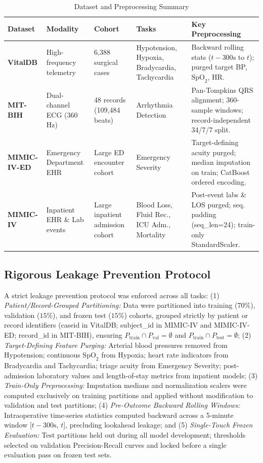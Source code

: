 \documentclass[conference]{IEEEtran}
\begin{document}
\begin{table}[t]
\centering
\caption{Dataset and Preprocessing Summary}
\label{tab:datasets}
\begin{tabularx}{\textwidth}{l l l l X}
\toprule
\textbf{Dataset} & \textbf{Modality} & \textbf{Cohort} & \textbf{Tasks} & \textbf{Key Preprocessing} \\
\midrule
\textbf{VitalDB} \cite{ref1} & High-frequency telemetry & 6,388 surgical cases & Hypotension, Hypoxia, Bradycardia, Tachycardia & Backward rolling stats ($t-300\text{s}$ to $t$); purged target BP, $\text{SpO}_2$, HR. \\
\textbf{MIT-BIH} & Dual-channel ECG (360 Hz) & 48 records (109,484 beats) & Arrhythmia Detection & Pan-Tompkins QRS alignment; 360-sample windows; record-independent 34/7/7 split. \\
\textbf{MIMIC-IV-ED} & Emergency Department EHR & Large ED encounter cohort & Emergency Severity & Target-defining acuity purged; median imputation on train; CatBoost ordered encoding. \\
\textbf{MIMIC-IV} & Inpatient EHR \& Lab events & Large inpatient admission cohort & Blood Loss, Fluid Rec., ICU Adm., Mortality & Post-event labs \& LOS purged; seq. padding (seq\_len=24); train-only StandardScaler. \\
\bottomrule
\end{tabularx}
\end{table}

\subsection{Rigorous Leakage Prevention Protocol}
A strict leakage prevention protocol was enforced across all tasks: (1) \textit{Patient/Record-Grouped Partitioning:} Data were partitioned into training ($70\%$), validation ($15\%$), and frozen test ($15\%$) cohorts, grouped strictly by patient or record identifiers (caseid in VitalDB; subject\_id in MIMIC-IV and MIMIC-IV-ED; record\_id in MIT-BIH), ensuring $P_{\text{train}} \cap P_{\text{val}} = \emptyset$ and $P_{\text{train}} \cap P_{\text{test}} = \emptyset$; (2) \textit{Target-Defining Feature Purging:} Arterial blood pressures removed from Hypotension; continuous $\text{SpO}_2$ from Hypoxia; heart rate indicators from Bradycardia and Tachycardia; triage acuity from Emergency Severity; post-admission laboratory values and length-of-stay metrics from inpatient models; (3) \textit{Train-Only Preprocessing:} Imputation medians and normalization scalers were computed exclusively on training partitions and applied without modification to validation and test partitions; (4) \textit{Pre-Outcome Backward Rolling Windows:} Intraoperative time-series statistics computed backward across a 5-minute window [$t - 300\text{s}$, $t$], precluding lookahead leakage; and (5) \textit{Single-Touch Frozen Evaluation:} Test partitions held out during all model development; thresholds selected on validation Precision-Recall curves and locked before a single evaluation pass on frozen test sets.
\end{document}
